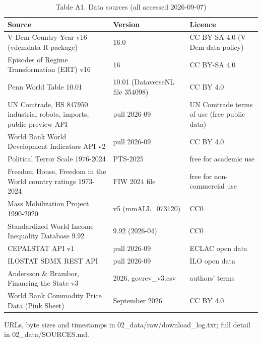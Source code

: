 \begin{table}[htbp]\centering
\caption{Table A1. Data sources (all accessed 2026-09-07)}
\label{tab:sources}
\scriptsize
\begin{tabular}{p{7cm}p{4cm}p{3.5cm}}
\toprule
Source & Version & Licence \\
\midrule
V-Dem Country-Year v16 (vdemdata R package) & 16.0 & CC BY-SA 4.0 (V-Dem data policy) \\
Episodes of Regime Transformation (ERT) v16 & 16 & CC BY-SA 4.0 \\
Penn World Table 10.01 & 10.01 (DataverseNL file 354098) & CC BY 4.0 \\
UN Comtrade, HS 847950 industrial robots, imports, public preview API & pull 2026-09 & UN Comtrade terms of use (free public data) \\
World Bank World Development Indicators API v2 & pull 2026-09 & CC BY 4.0 \\
Political Terror Scale 1976-2024 & PTS-2025 & free for academic use \\
Freedom House, Freedom in the World country ratings 1973-2024 & FIW 2024 file & free for non-commercial use \\
Mass Mobilization Project 1990-2020 & v5 (mmALL_073120) & CC0 \\
Standardized World Income Inequality Database 9.92 & 9.92 (2026-04) & CC0 \\
CEPALSTAT API v1 & pull 2026-09 & ECLAC open data \\
ILOSTAT SDMX REST API & pull 2026-09 & ILO open data \\
Andersson \& Brambor, Financing the State v3 & 2026, govrev_v3.csv & authors' terms \\
World Bank Commodity Price Data (Pink Sheet) & September 2026 & CC BY 4.0 \\
\bottomrule
\end{tabular}
\begin{tablenotes}\footnotesize URLs, byte sizes and timestamps in 02\_data/raw/download\_log.txt; full detail in 02\_data/SOURCES.md.\end{tablenotes}
\end{table}